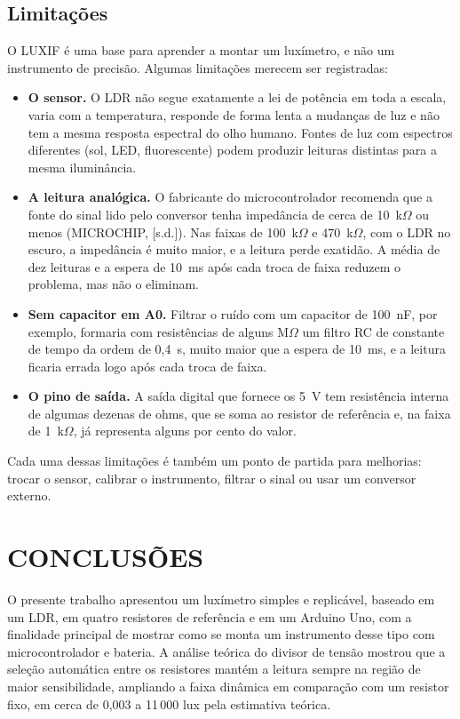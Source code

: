 \documentclass[11pt,a4paper]{article}
\begin{document}
\subsection*{Limitações}

O LUXIF é uma base para aprender a montar um luxímetro, e não um instrumento de precisão. Algumas limitações merecem ser registradas:

\begin{itemize}
	\item \textbf{O sensor.} O LDR não segue exatamente a lei de potência em toda a escala, varia com a temperatura, responde de forma lenta a mudanças de luz e não tem a mesma resposta espectral do olho humano. Fontes de luz com espectros diferentes (sol, LED, fluorescente) podem produzir leituras distintas para a mesma iluminância.
	\item \textbf{A leitura analógica.} O fabricante do microcontrolador recomenda que a fonte do sinal lido pelo conversor tenha impedância de cerca de 10~k$\Omega$ ou menos (MICROCHIP, [s.d.]). Nas faixas de 100~k$\Omega$ e 470~k$\Omega$, com o LDR no escuro, a impedância é muito maior, e a leitura perde exatidão. A média de dez leituras e a espera de 10~ms após cada troca de faixa reduzem o problema, mas não o eliminam.
	\item \textbf{Sem capacitor em A0.} Filtrar o ruído com um capacitor de 100~nF, por exemplo, formaria com resistências de alguns M$\Omega$ um filtro RC de constante de tempo da ordem de 0,4~s, muito maior que a espera de 10~ms, e a leitura ficaria errada logo após cada troca de faixa.
	\item \textbf{O pino de saída.} A saída digital que fornece os 5~V tem resistência interna de algumas dezenas de ohms, que se soma ao resistor de referência e, na faixa de 1~k$\Omega$, já representa alguns por cento do valor.
\end{itemize}

Cada uma dessas limitações é também um ponto de partida para melhorias: trocar o sensor, calibrar o instrumento, filtrar o sinal ou usar um conversor externo.

\section*{CONCLUSÕES}

O presente trabalho apresentou um luxímetro simples e replicável, baseado em um LDR, em quatro resistores de referência e em um Arduino Uno, com a finalidade principal de mostrar como se monta um instrumento desse tipo com microcontrolador e bateria. A análise teórica do divisor de tensão mostrou que a seleção automática entre os resistores mantém a leitura sempre na região de maior sensibilidade, ampliando a faixa dinâmica em comparação com um resistor fixo, em cerca de 0,003 a 11\,000 lux pela estimativa teórica.
\end{document}
